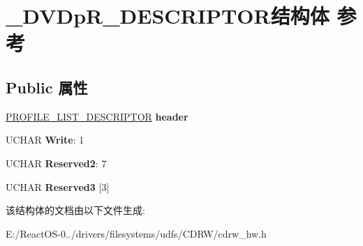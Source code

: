 \hypertarget{struct___d_v_dp_r___d_e_s_c_r_i_p_t_o_r}{}\section{\+\_\+\+D\+V\+Dp\+R\+\_\+\+D\+E\+S\+C\+R\+I\+P\+T\+O\+R结构体 参考}
\label{struct___d_v_dp_r___d_e_s_c_r_i_p_t_o_r}
\subsection*{Public 属性}
\begin{DoxyCompactItemize}
\item 
\mbox{\label{struct___d_v_dp_r___d_e_s_c_r_i_p_t_o_r_a0ca4c7b569efeed7a88b9bb4f06f4ee4}} 
\hyperlink{struct___p_r_o_f_i_l_e___l_i_s_t___d_e_s_c_r_i_p_t_o_r}{P\+R\+O\+F\+I\+L\+E\+\_\+\+L\+I\+S\+T\+\_\+\+D\+E\+S\+C\+R\+I\+P\+T\+OR} {\bfseries header}
\item 
\mbox{\label{struct___d_v_dp_r___d_e_s_c_r_i_p_t_o_r_a1bd1f7c5542621ebcd9472024d1839e4}} 
U\+C\+H\+AR {\bfseries Write}\+: 1
\item 
\mbox{\label{struct___d_v_dp_r___d_e_s_c_r_i_p_t_o_r_aed734cab81374feb363c9d6e6c483f57}} 
U\+C\+H\+AR {\bfseries Reserved2}\+: 7
\item 
\mbox{\label{struct___d_v_dp_r___d_e_s_c_r_i_p_t_o_r_a4b82e8eaa997e5029d8d33b5d800cb36}} 
U\+C\+H\+AR {\bfseries Reserved3} \mbox{[}3\mbox{]}
\end{DoxyCompactItemize}


该结构体的文档由以下文件生成\+:\begin{DoxyCompactItemize}
\item 
E\+:/\+React\+O\+S-\/0../drivers/filesystems/udfs/\+C\+D\+R\+W/cdrw\+\_\+hw.\+h\end{DoxyCompactItemize}
